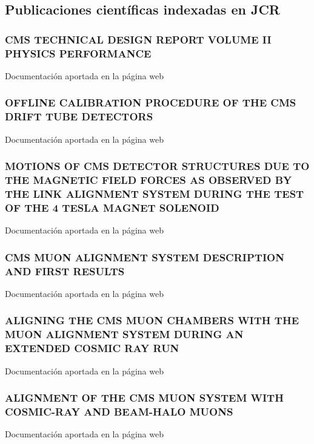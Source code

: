 \documentclass[a4paper, 11pt, twoside, openright]{report}
\begin{document}
\subsection{Publicaciones científicas indexadas en JCR}

\subsubsection{CMS TECHNICAL DESIGN REPORT VOLUME II PHYSICS PERFORMANCE}
Documentación aportada en la página web
%
\subsubsection{OFFLINE CALIBRATION PROCEDURE OF THE CMS DRIFT TUBE DETECTORS}
Documentación aportada en la página web
%
\subsubsection{MOTIONS OF CMS DETECTOR STRUCTURES DUE TO THE MAGNETIC FIELD FORCES AS OBSERVED BY THE LINK ALIGNMENT SYSTEM DURING THE TEST OF THE 4 TESLA MAGNET SOLENOID}
Documentación aportada en la página web
%
\subsubsection{CMS MUON ALIGNMENT SYSTEM DESCRIPTION AND FIRST RESULTS}
Documentación aportada en la página web
%
\subsubsection{ALIGNING THE CMS MUON CHAMBERS WITH THE MUON ALIGNMENT SYSTEM DURING AN EXTENDED COSMIC RAY RUN}
Documentación aportada en la página web
%
\subsubsection{ALIGNMENT OF THE CMS MUON SYSTEM WITH COSMIC-RAY AND BEAM-HALO MUONS}
Documentación aportada en la página web
%
\end{document}
